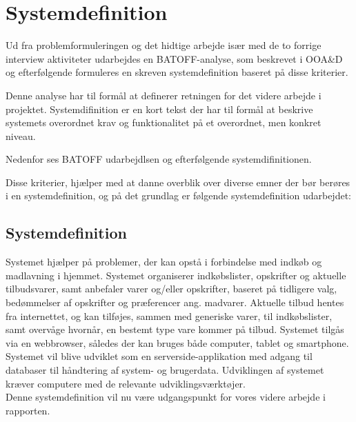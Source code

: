 \section{Systemdefinition}
Ud fra problemformuleringen og det hidtige arbejde især med de to forrige interview aktiviteter udarbejdes en BATOFF-analyse, som beskrevet i OOA\&D\citep{OOA&D2001} og efterfølgende formuleres en skreven systemdefinition baseret på disse kriterier.

Denne analyse har til formål at definerer retningen for det videre arbejde i projektet.
Systemdifinition er en kort tekst der har til formål at beskrive systemets overordnet krav og funktionalitet på et overordnet, men konkret niveau.

Nedenfor ses BATOFF udarbejdlsen og efterfølgende systemdifinitionen.



Disse kriterier, hjælper med at danne overblik over diverse emner der bør berøres i en systemdefinition, og på det grundlag er følgende systemdefinition udarbejdet:

\subsection{Systemdefinition}

Systemet hjælper på problemer, der kan opstå i forbindelse med indkøb og madlavning i hjemmet.
Systemet organiserer indkøbslister, opskrifter og aktuelle tilbudsvarer, samt anbefaler varer og/eller opskrifter, baseret på tidligere valg, bedømmelser af opskrifter og præferencer ang. madvarer.
Aktuelle tilbud hentes fra internettet, og kan tilføjes, sammen med generiske varer, til indkøbslister, samt overvåge hvornår, en bestemt type vare kommer på tilbud.
Systemet tilgås via en webbrowser, således der kan bruges både computer, tablet og smartphone.
Systemet vil blive udviklet som en serverside-applikation med adgang til databaser til håndtering af system- og brugerdata.
Udviklingen af systemet kræver computere med de relevante udviklingsværktøjer.\\

Denne systemdefinition vil nu være udgangspunkt for vores videre arbejde i rapporten.
